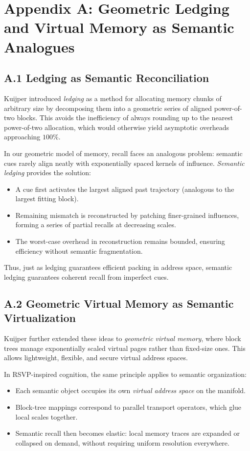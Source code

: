 \documentclass[a4paper,12pt]{article}
\begin{document}
\newpage
\appendix
\section*{Appendix A: Geometric Ledging and Virtual Memory as Semantic Analogues}

\subsection*{A.1 Ledging as Semantic Reconciliation}
Kuijper \citep{kuijper2021geometric} introduced \emph{ledging} as a method for
allocating memory chunks of arbitrary size by decomposing them into a geometric
series of aligned power-of-two blocks.
This avoids the inefficiency of always rounding up to the nearest power-of-two
allocation, which would otherwise yield asymptotic overheads approaching $100\%$.

In our geometric model of memory, recall faces an analogous problem:
semantic cues rarely align neatly with exponentially spaced kernels of influence.
\emph{Semantic ledging} provides the solution:
\begin{itemize}
    \item A cue first activates the largest aligned past trajectory (analogous to the largest fitting block).
    \item Remaining mismatch is reconstructed by patching finer-grained influences, 
          forming a series of partial recalls at decreasing scales.
    \item The worst-case overhead in reconstruction remains bounded, 
          ensuring efficiency without semantic fragmentation.
\end{itemize}
Thus, just as ledging guarantees efficient packing in address space,
semantic ledging guarantees coherent recall from imperfect cues.

\subsection*{A.2 Geometric Virtual Memory as Semantic Virtualization}
Kuijper further extended these ideas to \emph{geometric virtual memory}, where
block trees manage exponentially scaled virtual pages rather than fixed-size ones.
This allows lightweight, flexible, and secure virtual address spaces.

In RSVP-inspired cognition, the same principle applies to semantic organization:
\begin{itemize}
    \item Each semantic object occupies its own \emph{virtual address space} on the manifold.
    \item Block-tree mappings correspond to parallel transport operators, which glue local scales together.
    \item Semantic recall then becomes elastic: local memory traces are expanded or collapsed on demand,
          without requiring uniform resolution everywhere.
\end{itemize}
\end{document}
